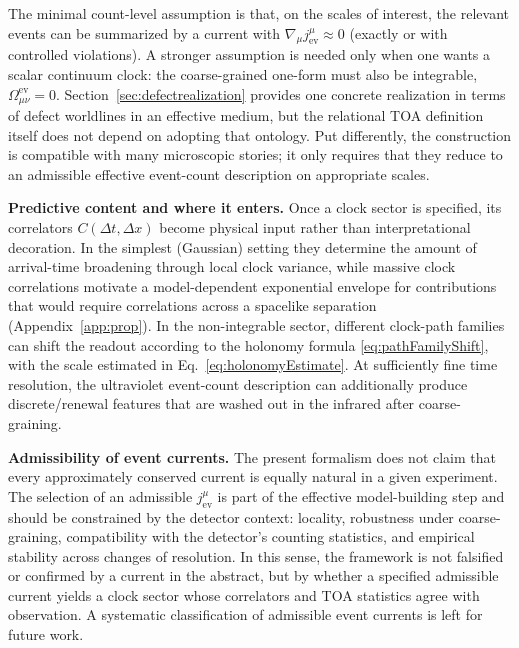 \documentclass[pdflatex,sn-mathphys-num]{sn-jnl}
\theoremstyle{thmstylethree}
\theoremstyle{thmstyleone}
\theoremstyle{thmstyletwo}
\numberwithin{equation}{section}
\begin{document}
        The minimal count-level assumption is that, on the scales of interest, the relevant events can be summarized by a current with $\nabla_\mu j^\mu_{\mathrm{ev}}\approx 0$ (exactly or with controlled violations). A stronger assumption is needed only when one wants a scalar continuum clock: the coarse-grained one-form must also be integrable, $\Omega^{\mathrm{ev}}_{\mu\nu}=0$. Section~\ref{sec:defectrealization} provides one concrete realization in terms of defect worldlines in an effective medium, but the relational TOA definition itself does not depend on adopting that ontology. Put differently, the construction is compatible with many microscopic stories; it only requires that they reduce to an admissible effective event-count description on appropriate scales.
        
        \medskip
        \noindent
        \textbf{Predictive content and where it enters.}
        Once a clock sector is specified, its correlators $C(\Delta t,\Delta x)$ become physical input rather than interpretational decoration. In the simplest (Gaussian) setting they determine the amount of arrival-time broadening through local clock variance, while massive clock correlations motivate a model-dependent exponential envelope for contributions that would require correlations across a spacelike separation (Appendix~\ref{app:prop}). In the non-integrable sector, different clock-path families can shift the readout according to the holonomy formula \eqref{eq:pathFamilyShift}, with the scale estimated in Eq.~\eqref{eq:holonomyEstimate}. At sufficiently fine time resolution, the ultraviolet event-count description can additionally produce discrete/renewal features that are washed out in the infrared after coarse-graining.

        \medskip
        \noindent
        \textbf{Admissibility of event currents.}
        The present formalism does not claim that every approximately conserved current is equally natural in a given experiment. The selection of an admissible $j^\mu_{\mathrm{ev}}$ is part of the effective model-building step and should be constrained by the detector context: locality, robustness under coarse-graining, compatibility with the detector's counting statistics, and empirical stability across changes of resolution. In this sense, the framework is not falsified or confirmed by a current in the abstract, but by whether a specified admissible current yields a clock sector whose correlators and TOA statistics agree with observation. A systematic classification of admissible event currents is left for future work.
    
\end{document}
